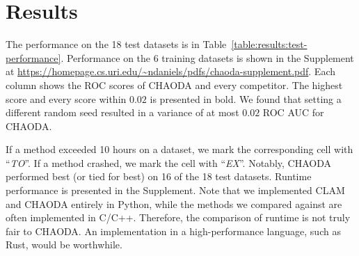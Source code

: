\section{Results}
\label{sec:results}

The performance on the 18 test datasets is in Table~\ref{table:results:test-performance}.
Performance on the 6 training datasets is shown in the Supplement at \url{https://homepage.cs.uri.edu/~ndaniels/pdfs/chaoda-supplement.pdf}.
Each column shows the ROC scores of CHAODA and every competitor.
The highest score and every score within $0.02$ is presented in bold.
We found that setting a different random seed resulted in a variance of at most $0.02$ ROC AUC for CHAODA.

If a method exceeded 10 hours on a dataset, we mark the corresponding cell with ``\textit{TO}''.
If a method crashed, we mark the cell with ``\textit{EX}''.
Notably, CHAODA performed best (or tied for best) on 16 of the 18 test datasets.
Runtime performance is presented in the Supplement. 
Note that we implemented CLAM and CHAODA entirely in Python, while the methods we compared against are often implemented in C/C++.
Therefore, the comparison of runtime is not truly fair to CHAODA.
An implementation in a high-performance language, such as Rust, would be worthwhile.

